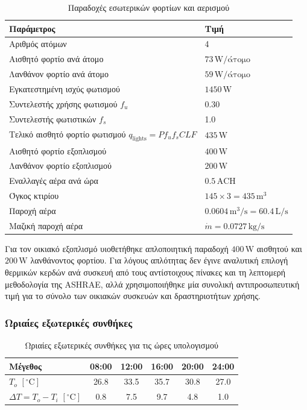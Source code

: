 \documentclass[12pt,a4paper]{article}
\begin{document}
\begin{table}[H]
\centering
\caption{Παραδοχές εσωτερικών φορτίων και αερισμού}
\begin{tabularx}{\textwidth}{L C{4.3cm}}
\toprule
\textbf{Παράμετρος} & \textbf{Τιμή} \\
\midrule
Αριθμός ατόμων & 4 \\
Αισθητό φορτίο ανά άτομο & \(73\,\mathrm{W/άτομο}\) \\
Λανθάνον φορτίο ανά άτομο & \(59\,\mathrm{W/άτομο}\) \\
Εγκατεστημένη ισχύς φωτισμού & \(1450\,\mathrm{W}\) \\
Συντελεστής χρήσης φωτισμού \(f_u\) & 0.30 \\
Συντελεστής φωτιστικών \(f_s\) & 1.0 \\
Τελικό αισθητό φορτίο φωτισμού \(q_{\text{lights}} = P f_u f_s CLF\) & \(435\,\mathrm{W}\) \\
Αισθητό φορτίο εξοπλισμού & \(400\,\mathrm{W}\) \\
Λανθάνον φορτίο εξοπλισμού & \(200\,\mathrm{W}\) \\
Εναλλαγές αέρα ανά ώρα & \(0.5\,\mathrm{ACH}\) \\
Όγκος κτιρίου & \(145 \times 3 = 435\,\mathrm{m^3}\) \\
Παροχή αέρα & \(0.0604\,\mathrm{m^3/s} = 60.4\,\mathrm{L/s}\) \\
Μαζική παροχή αέρα & \(\dot m = 0.0727\,\mathrm{kg/s}\) \\
\bottomrule
\end{tabularx}
\end{table}

Για τον οικιακό εξοπλισμό υιοθετήθηκε απλοποιητική παραδοχή
\(400\,\mathrm{W}\) αισθητού και \(200\,\mathrm{W}\) λανθάνοντος φορτίου.
Για λόγους απλότητας δεν έγινε αναλυτική επιλογή θερμικών κερδών ανά συσκευή
από τους αντίστοιχους πίνακες και τη λεπτομερή μεθοδολογία της ASHRAE, αλλά
χρησιμοποιήθηκε μία συνολική αντιπροσωπευτική τιμή για το σύνολο των οικιακών
συσκευών και δραστηριοτήτων χρήσης.

\subsubsection{Ωριαίες εξωτερικές συνθήκες}

\begin{table}[H]
\centering
\caption{Ωριαίες εξωτερικές συνθήκες για τις ώρες υπολογισμού}
\begin{tabular}{lccccc}
\toprule
\textbf{Μέγεθος} & \textbf{08:00} & \textbf{12:00} & \textbf{16:00} & \textbf{20:00} & \textbf{24:00} \\
\midrule
\(T_o\) \([\!^\circ\mathrm{C}]\) & 26.8 & 33.5 & 35.7 & 30.8 & 27.0 \\
\(\Delta T = T_o - T_i\) \([\!^\circ\mathrm{C}]\) & 0.8 & 7.5 & 9.7 & 4.8 & 1.0 \\
\bottomrule
\end{tabular}
\end{table}
\end{document}
